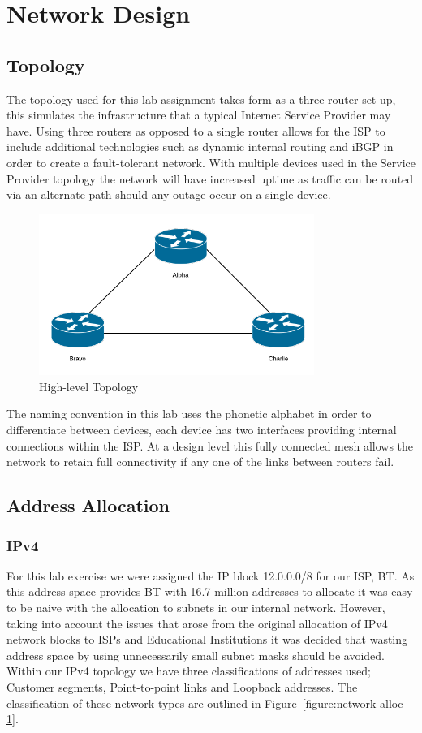 \chapter{Network Design}

\section{Topology}

The topology used for this lab assignment takes form as a three router set-up, this simulates the infrastructure that a typical Internet Service Provider may have. Using three routers as opposed to a single router allows for the ISP to include additional technologies such as dynamic internal routing and iBGP in order to create a fault-tolerant network. With multiple devices used in the Service Provider topology the network will have increased uptime as traffic can be routed via an alternate path should any outage occur on a single device.

\begin{figure}[h!]
	\caption{High-level Topology}
	\centering
	\includegraphics[width=0.8\textwidth]{images/networkTopology.png}
\end{figure}

The naming convention in this lab uses the phonetic alphabet in order to differentiate between devices, each device has two interfaces providing internal connections within the ISP. At a design level this fully connected mesh allows the network to retain full connectivity if any one of the links between routers fail.

\section{Address Allocation}
\subsection{IPv4}
For this lab exercise we were assigned the IP block 12.0.0.0/8 for our ISP, BT.
As this address space provides BT with 16.7 million addresses to allocate it was
easy to be naive with the allocation to subnets in our internal network.
However, taking into account the issues that arose from the original allocation
of IPv4 network blocks to ISPs and Educational Institutions it was decided that
wasting address space by using unnecessarily small subnet masks should be
avoided. Within our IPv4 topology we have three classifications of addresses
used; Customer segments, Point-to-point links and Loopback addresses. The classification of these network types are outlined in Figure~\ref{figure:network-alloc-1}.


